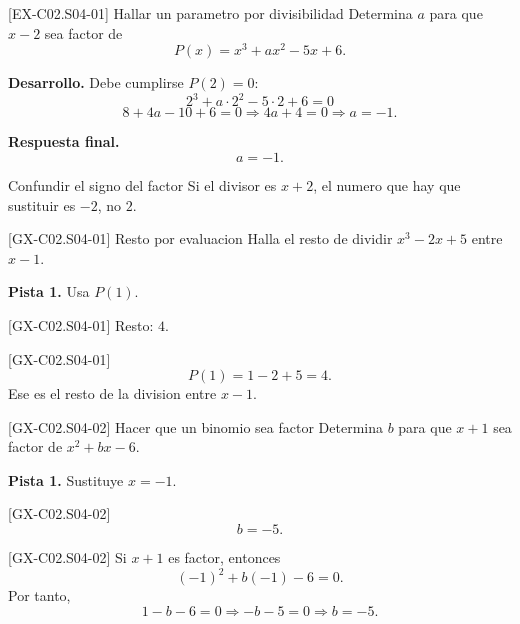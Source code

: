 \begin{solvedexample}{[EX-C02.S04-01] Hallar un parametro por divisibilidad}
Determina \(a\) para que \(x-2\) sea factor de
\[
P(x)=x^3+ax^2-5x+6.
\]

\textbf{Desarrollo.} Debe cumplirse \(P(2)=0\):
\[
2^3+a\cdot 2^2-5\cdot 2+6=0
\]
\[
8+4a-10+6=0 \Longrightarrow 4a+4=0 \Longrightarrow a=-1.
\]

\textbf{Respuesta final.}
\[
a=-1.
\]
\end{solvedexample}

\begin{commonerror}{Confundir el signo del factor}
Si el divisor es \(x+2\), el numero que hay que sustituir es \(-2\), no \(2\).
\end{commonerror}

\begin{guidedexercise}{[GX-C02.S04-01] Resto por evaluacion}
Halla el resto de dividir \(x^3-2x+5\) entre \(x-1\).

\textbf{Pista 1.} Usa \(P(1)\).
\end{guidedexercise}

\begin{shortanswer}{[GX-C02.S04-01]}
Resto: \(4\).
\end{shortanswer}

\begin{fullsolution}{[GX-C02.S04-01]}
\[
P(1)=1-2+5=4.
\]
Ese es el resto de la division entre \(x-1\).
\end{fullsolution}

\begin{guidedexercise}{[GX-C02.S04-02] Hacer que un binomio sea factor}
Determina \(b\) para que \(x+1\) sea factor de \(x^2+bx-6\).

\textbf{Pista 1.} Sustituye \(x=-1\).
\end{guidedexercise}

\begin{shortanswer}{[GX-C02.S04-02]}
\[
b=-5.
\]
\end{shortanswer}

\begin{fullsolution}{[GX-C02.S04-02]}
Si \(x+1\) es factor, entonces
\[
(-1)^2+b(-1)-6=0.
\]
Por tanto,
\[
1-b-6=0 \Longrightarrow -b-5=0 \Longrightarrow b=-5.
\]
\end{fullsolution}

